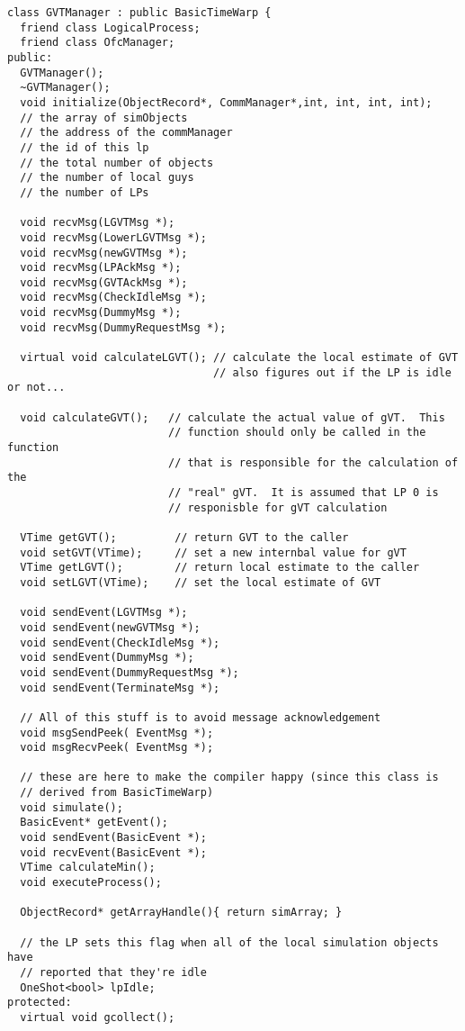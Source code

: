 \documentclass[11pt]{report}
\begin{document}
\begin{verbatim}
class GVTManager : public BasicTimeWarp {
  friend class LogicalProcess;
  friend class OfcManager;
public:
  GVTManager();
  ~GVTManager();
  void initialize(ObjectRecord*, CommManager*,int, int, int, int); 
  // the array of simObjects
  // the address of the commManager
  // the id of this lp
  // the total number of objects
  // the number of local guys
  // the number of LPs
  
  void recvMsg(LGVTMsg *);
  void recvMsg(LowerLGVTMsg *);
  void recvMsg(newGVTMsg *);
  void recvMsg(LPAckMsg *);
  void recvMsg(GVTAckMsg *);
  void recvMsg(CheckIdleMsg *);
  void recvMsg(DummyMsg *);
  void recvMsg(DummyRequestMsg *);

  virtual void calculateLGVT(); // calculate the local estimate of GVT
                                // also figures out if the LP is idle or not...

  void calculateGVT();   // calculate the actual value of gVT.  This
                         // function should only be called in the function
                         // that is responsible for the calculation of the
                         // "real" gVT.  It is assumed that LP 0 is 
                         // responisble for gVT calculation

  VTime getGVT();         // return GVT to the caller
  void setGVT(VTime);     // set a new internbal value for gVT
  VTime getLGVT();        // return local estimate to the caller
  void setLGVT(VTime);    // set the local estimate of GVT
  
  void sendEvent(LGVTMsg *);
  void sendEvent(newGVTMsg *);
  void sendEvent(CheckIdleMsg *);
  void sendEvent(DummyMsg *);
  void sendEvent(DummyRequestMsg *);
  void sendEvent(TerminateMsg *);

  // All of this stuff is to avoid message acknowledgement
  void msgSendPeek( EventMsg *);
  void msgRecvPeek( EventMsg *);

  // these are here to make the compiler happy (since this class is 
  // derived from BasicTimeWarp)
  void simulate();
  BasicEvent* getEvent();
  void sendEvent(BasicEvent *);
  void recvEvent(BasicEvent *);
  VTime calculateMin();
  void executeProcess();

  ObjectRecord* getArrayHandle(){ return simArray; }

  // the LP sets this flag when all of the local simulation objects have
  // reported that they're idle
  OneShot<bool> lpIdle;
protected:
  virtual void gcollect();


\end{verbatim}
\end{document}
